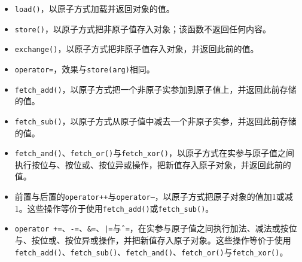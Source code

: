 \begin{itemize}
\item \texttt{load()}，以原子方式加载并返回对象的值。



\item \texttt{store()}，以原子方式把非原子值存入对象；该函数不返回任何内容。



\item \texttt{exchange()}，以原子方式把非原子值存入对象，并返回此前的值。



\item \texttt{operator=}，效果与\texttt{store(\allowbreak{}arg)}相同。



\item \texttt{fetch\_\allowbreak{}add()}，以原子方式把一个非原子实参加到原子值上，并返回此前存储的值。



\item \texttt{fetch\_\allowbreak{}sub()}，以原子方式从原子值中减去一个非原子实参，并返回此前存储的值。



\item \texttt{fetch\_\allowbreak{}and()}、\texttt{fetch\_\allowbreak{}or()}与\texttt{fetch\_\allowbreak{}xor()}，以原子方式在实参与原子值之间执行按位与、按位或、按位异或操作，把新值存入原子对象，并返回此前的值。



\item 前置与后置的\texttt{operator++}与\texttt{operator--}，以原子方式把原子对象的值加1或减1。这些操作等价于使用\texttt{fetch\_\allowbreak{}add()}或\texttt{fetch\_\allowbreak{}sub()}。



\item \texttt{operator +=}、\texttt{-\allowbreak{}=}、\texttt{\&=}、\texttt{|=}与\texttt{ˆ=}，在实参与原子值之间执行加法、减法或按位与、按位或、按位异或操作，并把新值存入原子对象。这些操作等价于使用\texttt{fetch\_\allowbreak{}add()}、\texttt{fetch\_\allowbreak{}sub()}、\texttt{fetch\_\allowbreak{}and()}、\texttt{fetch\_\allowbreak{}or()}与\texttt{fetch\_\allowbreak{}xor()}。

\end{itemize}



